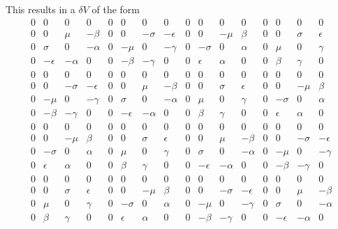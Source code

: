 \documentclass[12pt]{article}
\begin{document}
 This results in a $\delta V$ of the form
\begin{displaymath}
\begin{array}{cccccccccccccccc}
0 & 0 & 0 & 0 & 0 & 0 & 0 & 0 & 0 & 0 & 0 & 0 & 0 & 0 & 0 & 0 \\
0 & 0 & \mu &-\beta & 0 & 0 &-\sigma &-\epsilon & 0 & 0 &-\mu & \beta & 0 & 0 & \sigma & \epsilon \\
0 & \sigma & 0 &-\alpha & 0 &-\mu & 0 &-\gamma & 0 &-\sigma & 0 & \alpha & 0 & \mu & 0 & \gamma \\
0 &-\epsilon &-\alpha & 0 & 0 &-\beta &-\gamma & 0 & 0 & \epsilon & \alpha & 0 & 0 & \beta & \gamma & 0 \\
0 & 0 & 0 & 0 & 0 & 0 & 0 & 0 & 0 & 0 & 0 & 0 & 0 & 0 & 0 & 0 \\
0 & 0 &-\sigma &-\epsilon & 0 & 0 & \mu &-\beta & 0 & 0 & \sigma & \epsilon & 0 & 0 &-\mu & \beta \\
0 &-\mu & 0 &-\gamma & 0 & \sigma & 0 &-\alpha & 0 & \mu & 0 & \gamma & 0 &-\sigma & 0 & \alpha \\
0 &-\beta &-\gamma & 0 & 0 &-\epsilon &-\alpha & 0 & 0 & \beta & \gamma & 0 & 0 & \epsilon & \alpha & 0 \\
0 & 0 & 0 & 0 & 0 & 0 & 0 & 0 & 0 & 0 & 0 & 0 & 0 & 0 & 0 & 0 \\
0 & 0 &-\mu & \beta & 0 & 0 & \sigma & \epsilon & 0 & 0 & \mu &-\beta & 0 & 0 &-\sigma &-\epsilon \\
0 &-\sigma & 0 & \alpha & 0 & \mu & 0 & \gamma & 0 & \sigma & 0 &-\alpha & 0 &-\mu & 0 &-\gamma \\
0 & \epsilon & \alpha & 0 & 0 & \beta & \gamma & 0 & 0 &-\epsilon &-\alpha & 0 & 0 &-\beta &-\gamma & 0 \\
0 & 0 & 0 & 0 & 0 & 0 & 0 & 0 & 0 & 0 & 0 & 0 & 0 & 0 & 0 & 0 \\
0 & 0 & \sigma & \epsilon & 0 & 0 &-\mu & \beta & 0 & 0 &-\sigma &-\epsilon & 0 & 0 & \mu &-\beta \\
0 & \mu & 0 & \gamma & 0 &-\sigma & 0 & \alpha & 0 &-\mu & 0 &-\gamma & 0 & \sigma & 0 &-\alpha \\
0 & \beta & \gamma & 0 & 0 & \epsilon & \alpha & 0 & 0 &-\beta &-\gamma & 0 & 0 &-\epsilon &-\alpha & 0
\end{array}
\end{displaymath}
\end{document}

